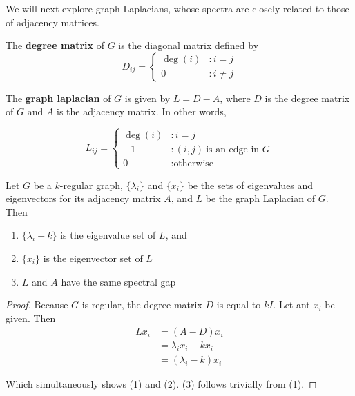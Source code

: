 We will next explore graph Laplacians, whose spectra are closely related to
those of adjacency matrices.

\begin{definition}
  \label{def:deg_mat}
  The \textbf{degree matrix} of $G$ is the diagonal matrix defined by
  \[
    D_{ij} = \begin{cases}
      \deg(i) &: i = j \\
      0 &: i \neq j
    \end{cases}
  \]
\end{definition}

\begin{definition}
  The \textbf{graph laplacian} of $G$ is given by $L = D - A$, where $D$ is the
  degree matrix of $G$ and $A$ is the adjacency matrix. In other words,

  \[
    L_{ij} = \begin{cases}
      \deg(i) &: i=j \\
      -1 &: (i,j) ~\text{is an edge in $G$} \\
      0 &: \text{otherwise}
    \end{cases}
  \]
\end{definition}

\begin{proposition}
  Let $G$ be a $k$-regular graph, $\{\lambda_i\}$ and $\{x_i\}$ be the sets of eigenvalues and
  eigenvectors for its adjacency matrix $A$, and $L$ be the graph Laplacian of $G$. Then
  \begin{enumerate}
  \item $\{\lambda_i - k\}$ is the eigenvalue set of $L$, and
  \item $\{x_i\}$ is the eigenvector set of $L$
  \item $L$ and $A$ have the same spectral gap
  \end{enumerate}
\end{proposition}

\begin{proof}
  Because $G$ is regular, the degree matrix $D$ is equal to $kI$. Let ant $x_i$ be given. Then
  \begin{align*}
    Lx_i &= (A-D)x_i \\
         &= \lambda_ix_i - kx_i \\
         &= (\lambda_i - k)x_i
  \end{align*}

  Which simultaneously shows (1) and (2). (3) follows trivially from (1).
\end{proof}

